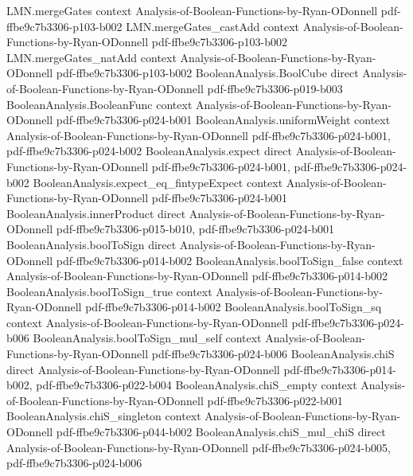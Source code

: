 \begin{theorem}
\proofstep
  {LMN.mergeGates}
  {context}
  {Analysis-of-Boolean-Functions-by-Ryan-ODonnell}
  {pdf-ffbe9c7b3306-p103-b002}
\proofstep
  {LMN.mergeGates_castAdd}
  {context}
  {Analysis-of-Boolean-Functions-by-Ryan-ODonnell}
  {pdf-ffbe9c7b3306-p103-b002}
\proofstep
  {LMN.mergeGates_natAdd}
  {context}
  {Analysis-of-Boolean-Functions-by-Ryan-ODonnell}
  {pdf-ffbe9c7b3306-p103-b002}
\proofstep
  {BooleanAnalysis.BoolCube}
  {direct}
  {Analysis-of-Boolean-Functions-by-Ryan-ODonnell}
  {pdf-ffbe9c7b3306-p019-b003}
\proofstep
  {BooleanAnalysis.BooleanFunc}
  {context}
  {Analysis-of-Boolean-Functions-by-Ryan-ODonnell}
  {pdf-ffbe9c7b3306-p024-b001}
\proofstep
  {BooleanAnalysis.uniformWeight}
  {context}
  {Analysis-of-Boolean-Functions-by-Ryan-ODonnell}
  {pdf-ffbe9c7b3306-p024-b001,
    pdf-ffbe9c7b3306-p024-b002}
\proofstep
  {BooleanAnalysis.expect}
  {direct}
  {Analysis-of-Boolean-Functions-by-Ryan-ODonnell}
  {pdf-ffbe9c7b3306-p024-b001,
    pdf-ffbe9c7b3306-p024-b002}
\proofstep
  {BooleanAnalysis.expect_eq_fintypeExpect}
  {context}
  {Analysis-of-Boolean-Functions-by-Ryan-ODonnell}
  {pdf-ffbe9c7b3306-p024-b001}
\proofstep
  {BooleanAnalysis.innerProduct}
  {direct}
  {Analysis-of-Boolean-Functions-by-Ryan-ODonnell}
  {pdf-ffbe9c7b3306-p015-b010,
    pdf-ffbe9c7b3306-p024-b001}
\proofstep
  {BooleanAnalysis.boolToSign}
  {direct}
  {Analysis-of-Boolean-Functions-by-Ryan-ODonnell}
  {pdf-ffbe9c7b3306-p014-b002}
\proofstep
  {BooleanAnalysis.boolToSign_false}
  {context}
  {Analysis-of-Boolean-Functions-by-Ryan-ODonnell}
  {pdf-ffbe9c7b3306-p014-b002}
\proofstep
  {BooleanAnalysis.boolToSign_true}
  {context}
  {Analysis-of-Boolean-Functions-by-Ryan-ODonnell}
  {pdf-ffbe9c7b3306-p014-b002}
\proofstep
  {BooleanAnalysis.boolToSign_sq}
  {context}
  {Analysis-of-Boolean-Functions-by-Ryan-ODonnell}
  {pdf-ffbe9c7b3306-p024-b006}
\proofstep
  {BooleanAnalysis.boolToSign_mul_self}
  {context}
  {Analysis-of-Boolean-Functions-by-Ryan-ODonnell}
  {pdf-ffbe9c7b3306-p024-b006}
\proofstep
  {BooleanAnalysis.chiS}
  {direct}
  {Analysis-of-Boolean-Functions-by-Ryan-ODonnell}
  {pdf-ffbe9c7b3306-p014-b002,
    pdf-ffbe9c7b3306-p022-b004}
\proofstep
  {BooleanAnalysis.chiS_empty}
  {context}
  {Analysis-of-Boolean-Functions-by-Ryan-ODonnell}
  {pdf-ffbe9c7b3306-p022-b001}
\proofstep
  {BooleanAnalysis.chiS_singleton}
  {context}
  {Analysis-of-Boolean-Functions-by-Ryan-ODonnell}
  {pdf-ffbe9c7b3306-p044-b002}
\proofstep
  {BooleanAnalysis.chiS_mul_chiS}
  {direct}
  {Analysis-of-Boolean-Functions-by-Ryan-ODonnell}
  {pdf-ffbe9c7b3306-p024-b005,
    pdf-ffbe9c7b3306-p024-b006}

\end{theorem}
